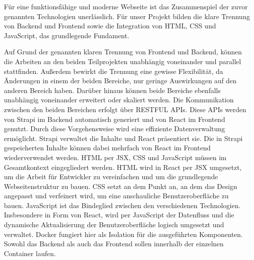 Für eine funktionsfähige und moderne Webseite ist das Zusammenspiel der zuvor genannten Technologien unerlässlich. Für unser Projekt bilden die klare Trennung von Backend und Frontend sowie die Integration von HTML, CSS und JavaScript, das grundlegende Fundament.

Auf Grund der genannten klaren Trennung von Frontend und Backend, können die Arbeiten an den beiden Teilprojekten unabhängig voneinander und parallel stattfinden. Außerdem bewirkt die Trennung eine gewisse Flexibilität, da Änderungen in einem der beiden Bereiche, nur geringe Auswirkungen auf den anderen Bereich haben. Darüber hinaus können beide Bereiche ebenfalls unabhängig voneinander erweitert oder skaliert werden.
Die Kommunikation zwischen den beiden Bereichen erfolgt über RESTFUL APIs. Diese APIs werden von Strapi im Backend automatisch generiert und von React im Frontend genutzt. Durch diese Vorgehensweise wird eine effiziente Datenverwaltung ermöglicht. Strapi verwaltet die Inhalte und React präsentiert sie. Die in Strapi gespeicherten Inhalte können dabei mehrfach von React im Frontend wiederverwendet werden.
HTML per JSX, CSS und JavaScript müssen im Gesamtkontext eingegliedert werden. HTML wird in React per JSX umgesetzt, um die Arbeit für Entwickler zu vereinfachen und um die grundlegende Webseitenstruktur zu bauen. CSS setzt an dem Punkt an, an dem das Design angepasst und verfeinert wird, um eine anschauliche Benutzeroberfläche zu bauen. JavaScript ist das Bindeglied zwischen den verschiedenen Technologien. Insbesondere in Form von React, wird per JavaScript der Datenfluss und die dynamische Aktualisierung der Benutzeroberfläche logisch umgesetzt und verwaltet.
Docker fungiert hier als Isolation für die ausgeführten Komponenten. Sowohl das Backend als auch das Frontend sollen innerhalb der einzelnen Container laufen.